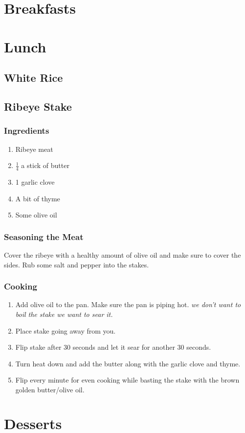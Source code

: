 
\chapter{Breakfasts}

\chapter{Lunch}
\section{White Rice}

\section{Ribeye Stake}
\subsection{Ingredients}
\begin{enumerate}
    \item Ribeye meat
    \item $\frac{1}{4}$ a stick of butter
    \item 1 garlic clove
    \item A bit of thyme
    \item Some olive oil
\end{enumerate}

\subsection{Seasoning the Meat}
Cover the ribeye with a healthy amount of olive oil and make sure to cover the sides. Rub some salt and pepper into the stakes.

\subsection{Cooking}
\begin{enumerate}
    \item Add olive oil to the pan. Make sure the pan is piping hot. \textit{we don't want to boil the stake we want to sear it.}
    \item Place stake going away from you.
    \item Flip stake after 30 seconds and let it sear for another 30 seconds.
    \item Turn heat down and add the butter along with the garlic clove and thyme.
    \item Flip every minute for even cooking while basting the stake with the brown golden butter/olive oil.
\end{enumerate}


\chapter{Desserts}


